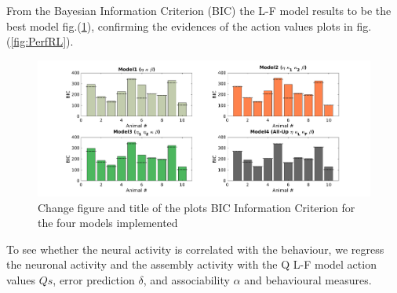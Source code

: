From the Bayesian Information Criterion (BIC) the L-F model results to be the best model fig.(\ref{fig:BIC}), confirming the evidences of the action values plots in fig.(\ref{fig:PerfRL}).
\begin{figure}
    \centering
    \includegraphics[scale=0.3]{figures/BIC_ModelCompare.png}
    \caption{{\color{red}Change figure and title of the plots} BIC Information Criterion for the four models implemented}
    \label{fig:BIC}
\end{figure}
To see whether the neural activity is correlated with the behaviour, we regress the neuronal activity and the assembly activity with the Q L-F model action values $Qs$, error prediction $\delta$, and associability $\alpha$ and behavioural measures. 
    
